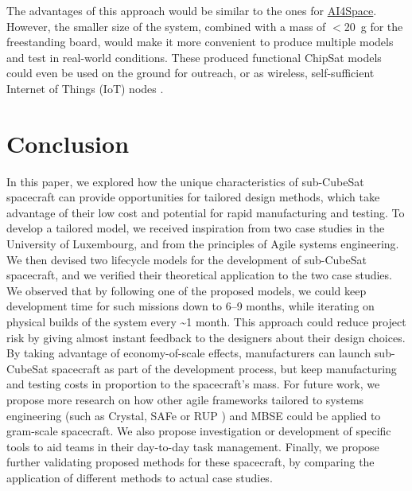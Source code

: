 \documentclass[]{iac}
\def\todo#1{}
\begin{document}
The advantages of this approach would be similar to the ones for \hyperref[sec:ai4spaceresults]{AI4Space}. However, the smaller size of the system, combined with a mass of \(<\)\SI{20}{\gram} for the freestanding board, would make it more convenient to produce multiple models and test in real-world conditions. These produced functional ChipSat models could even be used on the ground for outreach, or as wireless, self-sufficient Internet of Things (IoT) nodes \autocite{adams_theory_2020}.

\section{Conclusion}

In this paper, we explored how the unique characteristics of sub-CubeSat spacecraft can provide opportunities for tailored design methods, which take advantage of their low cost and potential for rapid manufacturing and testing. To develop a tailored model, we received inspiration from two case studies in the University of Luxembourg, and from the principles of Agile systems engineering. We then devised two lifecycle models for the development of sub-CubeSat spacecraft, and we verified their theoretical application to the two case studies.
We observed that by following one of the proposed models, we could keep development time for such missions down to 6--9 months, while iterating on physical builds of the system every \textasciitilde 1 month. This approach could reduce project risk by giving almost instant feedback to the designers about their design choices. By taking advantage of economy-of-scale effects, manufacturers can launch sub-CubeSat spacecraft as part of the development process, but keep manufacturing and testing costs in proportion to the spacecraft's mass.
For future work, we propose more research on how other agile frameworks tailored to systems engineering (such as Crystal, SAFe or RUP \autocite{boehm_balancing_2004,bott_analysis_2019}) and MBSE could be applied to gram-scale spacecraft. We also propose investigation or development of specific tools to aid teams in their day-to-day task management. Finally, we propose further validating proposed methods for these spacecraft, by comparing the application of different methods to actual case studies.

\end{document}
